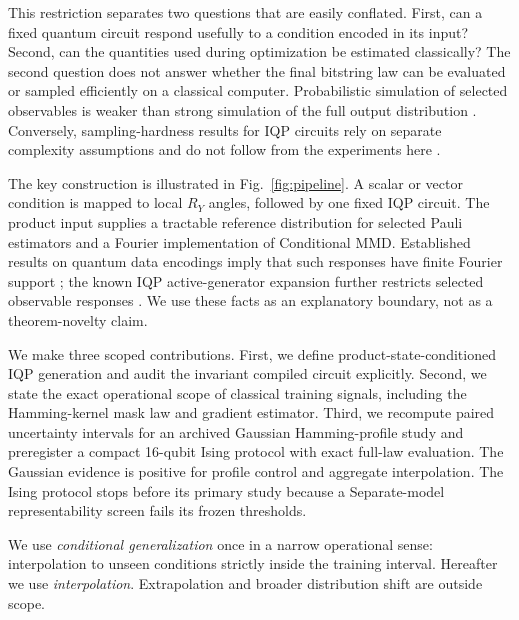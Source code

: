\documentclass[a4paper,twocolumn,11pt,unpublished]{quantumarticle}
\begin{document}
This restriction separates two questions that are easily conflated.  First,
can a fixed quantum circuit respond usefully to a condition encoded in its
input?  Second, can the quantities used during optimization be estimated
classically?  The second question does not answer whether the final bitstring
law can be evaluated or sampled efficiently on a classical computer.
Probabilistic simulation of selected observables is weaker than strong
simulation of the full output distribution
\cite{nestSimulatingQuantumComputers2011,niCommutingQuantumCircuits2012}.
Conversely, sampling-hardness results for IQP circuits rely on separate
complexity assumptions and do not follow from the experiments here
\cite{bremnerClassicalSimulation2011,bremnerAverageCase2016}.

The key construction is illustrated in Fig.~\ref{fig:pipeline}.  A scalar or
vector condition is mapped to local $R_Y$ angles, followed by one fixed IQP
circuit.  The product input supplies a tractable reference distribution for
selected Pauli estimators and a Fourier implementation of Conditional MMD.
Established results on quantum data encodings imply that such responses have
finite Fourier support
\cite{gilVidalInputRedundancy2020,schuldEffectDataEncoding2021,
casasMultidimensionalFourier2023}; the known IQP active-generator expansion
further restricts selected observable responses
\cite{recio-armengolTrainClassicalDeploy2026}.  We use these facts as an
explanatory boundary, not as a theorem-novelty claim.

We make three scoped contributions.  First, we define product-state-conditioned
IQP generation and audit the invariant compiled circuit explicitly.  Second,
we state the exact operational scope of classical training signals, including
the Hamming-kernel mask law and gradient estimator.  Third, we recompute paired
uncertainty intervals for an archived Gaussian Hamming-profile study and
preregister a compact 16-qubit Ising protocol with exact full-law evaluation.
The Gaussian evidence is positive for profile control and aggregate
interpolation.  The Ising protocol stops before its primary study because a
Separate-model representability screen fails its frozen thresholds.

We use \emph{conditional generalization} once in a narrow operational sense:
interpolation to unseen conditions strictly inside the training interval.
Hereafter we use \emph{interpolation}.  Extrapolation and broader distribution
shift are outside scope.
\end{document}
